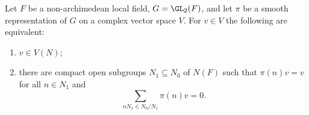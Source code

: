 Let $F$ be a non-archimedean local field, $G=\GL_2(F)$, and let $\pi$ be a smooth representation of $G$ on a complex
vector space $V$. For $v\in V$ the following are equivalent:
\begin{enumerate}[label=(\roman*)]
\item $v\in V(N)$;
\item there are compact open subgroups $N_1\subseteq N_0$ of $N(F)$ such that $\pi(n)v=v$ for all $n\in N_1$ and
  \[
    \sum_{nN_1\in N_0/N_1}\pi(n)v=0 .
  \]
\end{enumerate}
